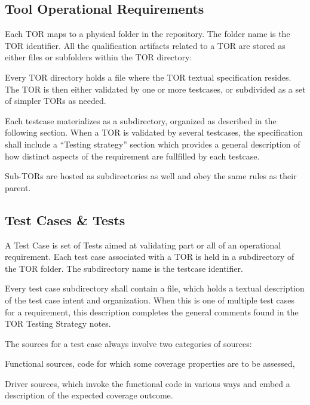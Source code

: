 \documentclass {report}
\begin{document}
\subsection{Tool Operational Requirements}

Each TOR maps to a physical folder in the repository.
%
The folder name is the TOR identifier.
%
All the qualification artifacts related to a TOR are stored as either files or
subfolders within the TOR directory:

Every TOR directory holds a  file where the TOR textual
specification resides.
%
The TOR is then either validated by one or more testcases, or subdivided
as a set of simpler TORs as needed.

Each testcase materializes as a subdirectory, organized as described in
the following section.
%
When a TOR is validated by several testcases, the  specification
shall include a ``Testing strategy'' section which provides a general
description of how distinct aspects of the requirement are fullfilled by each
testcase.

Sub-TORs are hosted as subdirectories as well and obey the same rules as
their parent.

\subsection{Test Cases \& Tests}

A Test Case is set of Tests aimed at validating part or all of an operational
requirement.
%
Each test case associated with a TOR is held in a subdirectory of the TOR
folder.
%
The subdirectory name is the testcase identifier.

Every test case subdirectory shall contain a  file, which holds
a textual description of the test case intent and organization.
%
When this is one of multiple test cases for a requirement, this description
completes the general comments found in the TOR Testing Strategy notes.

The sources for a test case always involve two categories of sources:

\begin{Itemize}
\item%
  Functional sources, code for which some coverage properties are to be
  assessed,
%
\item%
  Driver sources, which invoke the functional code in various ways and embed a
  description of the expected coverage outcome.
\end{Itemize}
\end{document}
